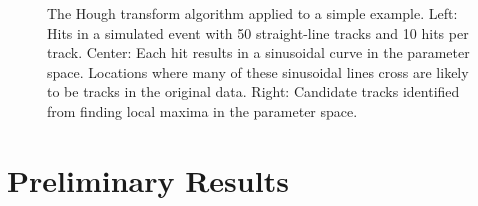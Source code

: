 \documentclass{JINST}
\begin{document}
\begin{figure}[!Hhtb]
\begin{center}
  \caption{The Hough transform algorithm applied to a simple example. Left: Hits in a simulated event with 50
    straight-line tracks and 10 hits per track. Center: Each hit results in a sinusoidal curve in the parameter
    space. Locations where many of these sinusoidal lines cross are likely to be tracks in the original data. Right:
    Candidate tracks identified from finding local maxima in the parameter space.\label{fig:hough}}
\end{center}
\end{figure}

\section{Preliminary Results}
\end{document}
